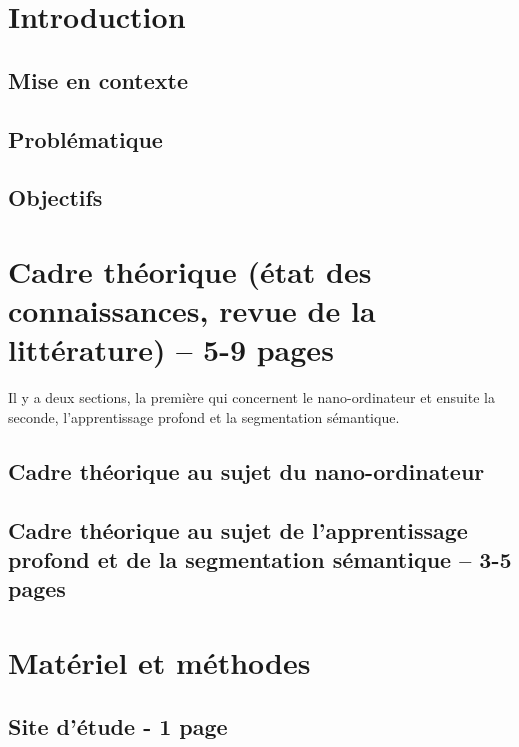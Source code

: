 \documentclass[12pt, letterpaper]{article}
\begin{document}
\newpage
{}

\section{Introduction}
\subsection{Mise en contexte}

\subsection{Problématique}

\subsection{Objectifs}


\section{Cadre théorique (état des connaissances, revue de la littérature) -- 5-9 pages}
Il y a deux sections, la première qui concernent le nano-ordinateur et ensuite la seconde, l'apprentissage profond et la segmentation sémantique.
\subsection{Cadre théorique au sujet du nano-ordinateur}

\subsection{Cadre théorique au sujet de l'apprentissage profond et de la segmentation sémantique -- 3-5 pages}


\section{Matériel et méthodes}
\subsection{Site d'étude - 1 page}

\end{document}

